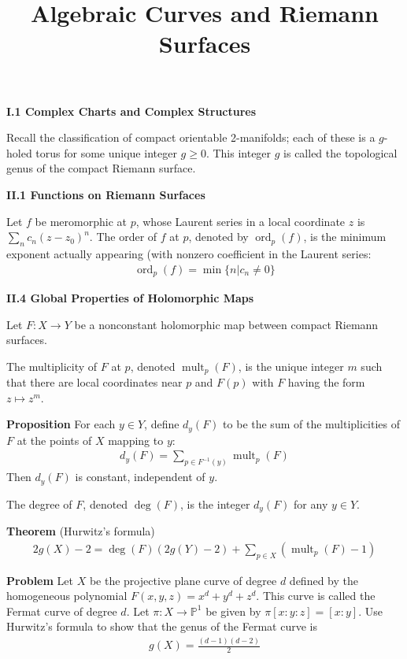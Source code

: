 \documentclass[hidelinks, 12pt]{article}
\title{Algebraic Curves and Riemann Surfaces}
\date{}
\DeclareMathOperator{\mult}{mult}
\DeclareMathOperator{\ord}{ord}
\theoremstyle{mydefstyle}
\theoremstyle{mythmstyle}
\begin{document}
\pagecolor{white}

\textbf{I.1 Complex Charts and Complex Structures}

Recall the classification of compact orientable 2-manifolds; each of these is a $g$-holed torus for some unique integer $g \ge 0$. This integer $g$ is called the topological genus of the compact Riemann surface.

\textbf{II.1 Functions on Riemann Surfaces}

Let $f$ be meromorphic at $p$, whose Laurent series in a local coordinate $z$ is $\sum_n c_n(z-z_0)^n$. The order of $f$ at $p$, denoted by $\ord_p(f)$, is the minimum exponent actually appearing (with nonzero coefficient in the Laurent series:
\begin{gather*}
\ord_p(f) = \min\{n \vert c_n \ne 0 \}
\end{gather*}

\textbf{II.4 Global Properties of Holomorphic Maps}

Let $F : X \to Y$ be a nonconstant holomorphic map between compact Riemann surfaces. 

The multiplicity of $F$ at $p$, denoted $\mult_p(F)$, is the unique integer $m$ such that there are local coordinates near $p$ and $F(p)$ with $F$ having the form $z \mapsto z^m$.

\textbf{Proposition} For each $y \in Y$, define $d_y(F)$ to be the sum of the multiplicities of $F$ at the points of $X$ mapping to $y$:
\begin{gather*}
d_y(F) = \sum_{p \in F^{-1}(y)} \mult_p(F)
\end{gather*}
Then $d_y(F)$ is constant, independent of $y$.

The degree of $F$, denoted $\deg(F)$, is the integer $d_y(F)$ for any $y \in Y$.

\textbf{Theorem} (Hurwitz's formula)
\begin{gather*}
2g(X) - 2 = \deg(F)(2g(Y) - 2) + \sum_{p \in X} (\mult_p(F) - 1)
\end{gather*}

\textbf{Problem} Let $X$ be the projective plane curve of degree $d$ defined by the homogeneous polynomial $F(x, y, z) = x^d + y^d + z^d$. This curve is called the Fermat curve of degree $d$. Let $\pi : X \to \mathbb{P}^1$ be given by $\pi[x:y:z] = [x:y]$. Use Hurwitz's formula to show that the genus of the Fermat curve is
\begin{gather*}
g(X) = \frac{(d-1)(d-2)}{2}
\end{gather*}
\end{document}

